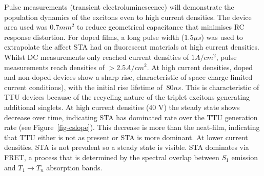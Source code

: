 \documentclass[
  letterpaper,
  DIV=11,
  numbers=noendperiod,
  oneside]{scrreprt}
\begin{document}
Pulse measurements (transient electroluminescence) will demonstrate the
population dynamics of the excitons even to high current densities. The
device area used was \(0.7mm^2\) to reduce geometrical capacitance that
minimises RC response distortion. For doped films, a long pulse width
(\(1.5\mu s\)) was used to extrapolate the affect STA had on fluorescent
materials at high current densities. Whilst DC measurements only reached
current densities of \(1 A/cm^2\), pulse measurements reach densities of
\(>2.5 A/cm^2\). At high current densities, doped and non-doped devices
show a sharp rise, characteristic of space charge limited current
conditions), with the initial rise lifetime of \(~80 ns\). This is
characteristic of TTU devices because of the recycling nature of the
triplet excitons generating additional singlets. At high current
densities (40 V) the steady state shows decrease over time, indicating
STA has dominated rate over the TTU generation rate (see
Figure~\ref{fig-cslope}). This decrease is more than the neat-film,
indicating that TTU either is not as present or STA is more dominant. At
lower current densities, STA is not prevalent so a steady state is
visible. STA dominates via FRET, a process that is determined by the
spectral overlap between \(S_1\) emission and \(T_1\rightarrow T_n\)
absorption bands.
\end{document}
